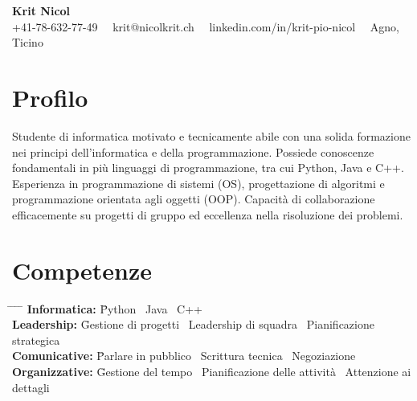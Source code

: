 \documentclass[a4paper,11pt]{article}  %
\begin{document}
\begin{center}
    {\fontsize{18pt}{22pt}\selectfont \textbf{Krit Nicol}} \\
    \vspace{0.2in}
    +41-78-632-77-49 \, \textbullet \, krit@nicolkrit.ch \, \textbullet \, linkedin.com/in/krit-pio-nicol \, \textbullet \, Agno, Ticino \\
\end{center}

\vspace{0.2in}

\section*{Profilo}
Studente di informatica motivato e tecnicamente abile con una solida formazione nei principi dell'informatica e della programmazione. 
Possiede conoscenze fondamentali in più linguaggi di programmazione, tra cui Python, Java e C++. 
Esperienza in programmazione di sistemi (OS), progettazione di algoritmi e programmazione orientata agli oggetti (OOP). 
Capacità di collaborazione efficacemente su progetti di gruppo ed eccellenza nella risoluzione dei problemi. 
\vspace{0.2in}

\section*{Competenze}
\begin{tabbing}
    \hspace{1in} \= \hspace{1in} \= \hspace{1in} \= \hspace{1in} \= \kill
    \textbf{Informatica:} \= Python \textbullet \, Java \textbullet \, C++ \\
    \textbf{Leadership:} \= Gestione di progetti \textbullet \, Leadership di squadra \textbullet \, Pianificazione strategica \\
    \textbf{Comunicative:} \= Parlare in pubblico \textbullet \, Scrittura tecnica \textbullet \, Negoziazione \\
    \textbf{Organizzative:} \= Gestione del tempo \textbullet \, Pianificazione delle attività \textbullet \, Attenzione ai dettagli \\
\end{tabbing}
\end{document}
